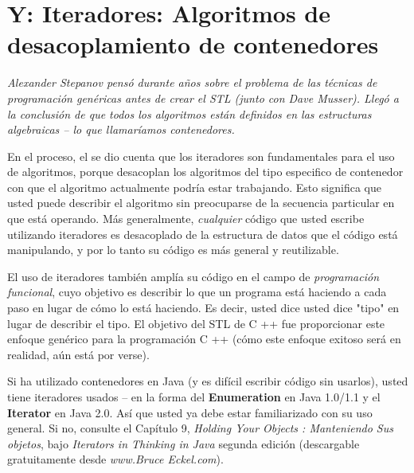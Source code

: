 \section*{\texorpdfstring{Y: Iteradores: \newline  Algoritmos de desacoplamiento de contenedores}{Y: Iteradores: Algoritmos de desacoplamiento de contenedores}}
\label{sec:yiadddc}



\textit{Alexander Stepanov pensó durante años sobre el problema de las técnicas de programación genéricas antes de crear el STL (junto con Dave Musser). Llegó a la conclusión de que todos los algoritmos están definidos en las estructuras algebraicas – lo que llamaríamos contenedores.}

En el proceso, el se dio cuenta que los iteradores son fundamentales para el uso de algoritmos, porque desacoplan los algoritmos del tipo especifico de contenedor con que el algoritmo actualmente podría estar trabajando. Esto significa que usted puede describir el algoritmo sin preocuparse de la secuencia particular en que está operando. Más generalmente, \textit{cualquier} código que usted escribe utilizando iteradores es desacoplado de la estructura de datos que el código está manipulando, y por lo tanto su código es más general y reutilizable. \newline

El uso de iteradores también amplía su código en el campo de \textit{programación funcional}, cuyo objetivo es describir lo que un programa está haciendo a cada paso en lugar de cómo lo está haciendo. Es decir, usted dice usted dice "tipo" en lugar de
describir el tipo. El objetivo del STL de C ++ fue proporcionar este enfoque genérico para la programación C ++ (cómo este enfoque exitoso será en realidad, aún está por verse). \newline

Si ha utilizado contenedores en Java (y es difícil escribir código sin usarlos), usted tiene iteradores usados – en la forma del \textbf{Enumeration} en Java 1.0/1.1 y el \textbf{Iterator} en Java 2.0. Así que usted ya debe estar familiarizado con su uso general. Si no, consulte el Capítulo 9, \textit{Holding Your Objects : Manteniendo Sus objetos}, bajo \textit{Iterators in Thinking in Java} segunda edición (descargable gratuitamente desde \textit{www.Bruce Eckel.com}). \newline

